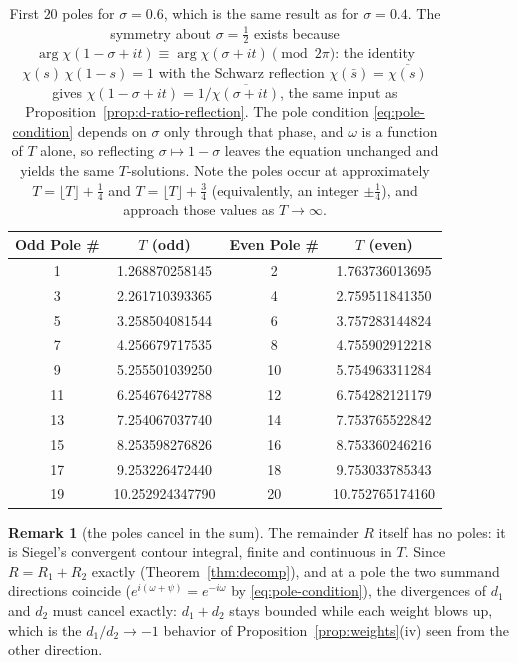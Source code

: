 \documentclass[11pt]{article}
\theoremstyle{definition}
\newtheorem{remark}[theorem]{Remark}
\begin{document}
\begin{table}[h!]
\centering
\begin{tabular}{|c|c|c|c|}
\hline
\textbf{Odd Pole \#} & \textbf{$T$ (odd)} & \textbf{Even Pole \#} & \textbf{$T$ (even)} \\ \hline
1  & 1.268870258145  & 2  & 1.763736013695 \\
3  & 2.261710393365  & 4  & 2.759511841350 \\
5  & 3.258504081544  & 6  & 3.757283144824 \\
7  & 4.256679717535  & 8  & 4.755902912218 \\
9  & 5.255501039250  & 10 & 5.754963311284 \\
11 & 6.254676427788  & 12 & 6.754282121179 \\
13 & 7.254067037740  & 14 & 7.753765522842 \\
15 & 8.253598276826  & 16 & 8.753360246216 \\
17 & 9.253226472440  & 18 & 9.753033785343 \\
19 & 10.252924347790 & 20 & 10.752765174160 \\
\hline
\end{tabular}
\caption{First $20$ poles for $\sigma=0.6$, which is the same result as
for $\sigma=0.4$. The symmetry about $\sigma=\tfrac12$ exists because
$\arg\chi(1-\sigma+it)\equiv\arg\chi(\sigma+it)\pmod{2\pi}$: the identity
$\chi(s)\,\chi(1-s)=1$ with the Schwarz reflection
$\chi(\bar s)=\overline{\chi(s)}$ gives
$\chi(1-\sigma+it)=1/\overline{\chi(\sigma+it)}$, the same input as
Proposition~\ref{prop:d-ratio-reflection}. The pole condition
\eqref{eq:pole-condition} depends on $\sigma$ only through that phase, and
$\omega$ is a function of $T$ alone, so reflecting $\sigma\mapsto1-\sigma$
leaves the equation unchanged and yields the same $T$-solutions. Note the poles occur at approximately
$T=\lfloor T\rfloor+\tfrac14$ and $T=\lfloor T\rfloor+\tfrac34$
(equivalently, an integer $\pm\tfrac14$), and approach those values as
$T\to\infty$.}
\label{tab:poles}
\end{table}

\begin{remark}[the poles cancel in the sum]
The remainder $R$ itself has no poles: it is Siegel's convergent contour
integral, finite and continuous in $T$. Since $R=R_{1}+R_{2}$ exactly
(Theorem~\ref{thm:decomp}), and at a pole the two summand directions
coincide ($e^{i(\omega+\psi)}=e^{-i\omega}$ by
\eqref{eq:pole-condition}), the divergences of $d_1$ and $d_2$ must
cancel exactly: $d_1+d_2$ stays bounded while each weight blows up, which
is the $d_1/d_2\to-1$ behavior of
Proposition~\ref{prop:weights}(iv) seen from the other direction.
\end{remark}
\end{document}
